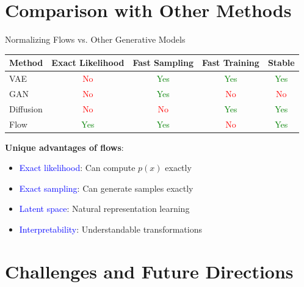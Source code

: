 \documentclass[aspectratio=169]{beamer}
\begin{document}
\section{Comparison with Other Methods}

\begin{frame}{Normalizing Flows vs. Other Generative Models}
\begin{table}
\centering
\begin{tabular}{|l|c|c|c|c|}
\hline
Method & Exact Likelihood & Fast Sampling & Fast Training & Stable \\
\hline
VAE & \textcolor{red}{No} & \textcolor{green}{Yes} & \textcolor{green}{Yes} & \textcolor{green}{Yes} \\
GAN & \textcolor{red}{No} & \textcolor{green}{Yes} & \textcolor{red}{No} & \textcolor{red}{No} \\
Diffusion & \textcolor{red}{No} & \textcolor{red}{No} & \textcolor{green}{Yes} & \textcolor{green}{Yes} \\
Flow & \textcolor{green}{Yes} & \textcolor{green}{Yes} & \textcolor{red}{No} & \textcolor{green}{Yes} \\
\hline
\end{tabular}
\end{table}

\textbf{Unique advantages of flows}:
\begin{itemize}
    \item \textcolor{blue}{Exact likelihood}: Can compute $p(x)$ exactly
    \item \textcolor{blue}{Exact sampling}: Can generate samples exactly
    \item \textcolor{blue}{Latent space}: Natural representation learning
    \item \textcolor{blue}{Interpretability}: Understandable transformations
\end{itemize}
\end{frame}

\section{Challenges and Future Directions}
\end{document}
